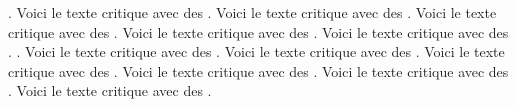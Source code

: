 \documentclass[openany]{book}
\begin{document}
\begin{pages}
\begin{Rightside}
    . Voici le texte critique avec des
    . Voici le texte critique avec des
    . Voici le texte critique avec des
    . Voici le texte critique avec des
    . Voici le texte critique avec des
    . 
    . Voici le texte critique avec des
    . Voici le texte critique avec des
    . Voici le texte critique avec des
    . Voici le texte critique avec des
    . Voici le texte critique avec des
    . Voici le texte critique avec des
    . 
    \pend
    \endnumbering
  \end{Rightside}
\end{pages}
\Pages
\end{document}
